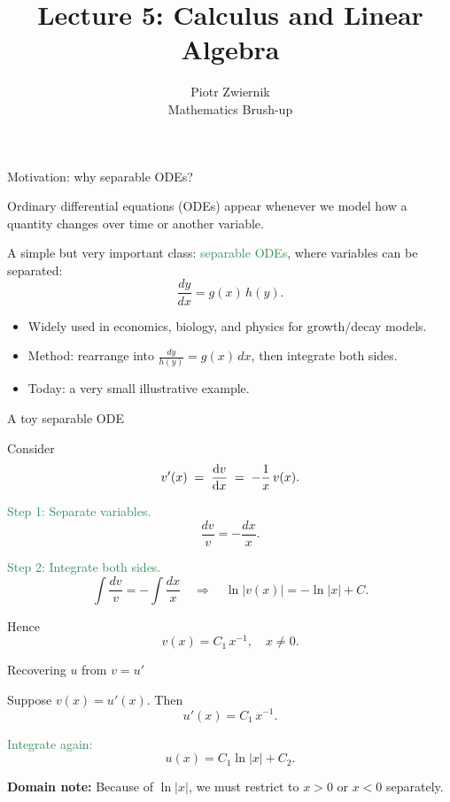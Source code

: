 \documentclass[11pt,aspectratio=169]{beamer}
\title[Calculus and Linear Algebra]{Lecture 5: Calculus and Linear Algebra}
\author[Piotr Zwiernik, Barcelona School of Economics]{Piotr Zwiernik\\[0.5ex]Mathematics Brush-up}
\date{}
\begin{document}
\begin{frame}
  \titlepage
\end{frame}

\begin{frame}{Motivation: why separable ODEs?}
\begin{small}
Ordinary differential equations (ODEs) appear whenever we model how a quantity changes over time or another variable.  

\medskip
A simple but very important class: \textcolor{SeaGreen}{separable ODEs}, where variables can be separated:
\[
\frac{dy}{dx} = g(x)\,h(y).
\]

\begin{itemize}
  \item Widely used in economics, biology, and physics for growth/decay models.
  \item Method: rearrange into \(\frac{dy}{h(y)} = g(x)\,dx\), then integrate both sides.
  \item Today: a very small illustrative example.
\end{itemize}
\end{small}
\end{frame}

\begin{frame}{A toy separable ODE}
\begin{small}
Consider
\[
v'(x)\;=\;\frac{{\rm d}v}{{\rm d}x}\;=\;-\frac{1}{x}\,v(x).
\]

\medskip
\textcolor{SeaGreen}{Step 1: Separate variables.}
\[
\frac{dv}{v} = -\frac{dx}{x}.
\]

\textcolor{SeaGreen}{Step 2: Integrate both sides.}
\[
\int \frac{dv}{v} = -\int \frac{dx}{x}
\quad\Rightarrow\quad
\ln|v(x)|=-\ln|x|+C.
\]

Hence
\[
v(x)=C_1\,x^{-1}, \quad x\neq 0.
\]
\end{small}
\end{frame}

\begin{frame}{Recovering $u$ from $v=u'$}
\begin{small}
Suppose \(v(x)=u'(x)\). Then
\[
u'(x)=C_1\,x^{-1}.
\]

\textcolor{SeaGreen}{Integrate again:}
\[
u(x)=C_1\ln|x|+C_2.
\]

\medskip
\textbf{Domain note:} Because of $\ln|x|$, we must restrict to $x>0$ or $x<0$ separately.
\end{small}
\end{frame}
\end{document}
